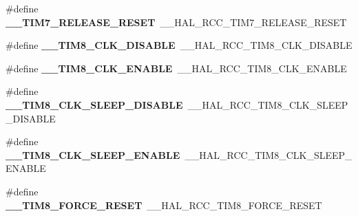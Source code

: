 \begin{DoxyCompactItemize}
\item 
\hypertarget{group___h_a_l___r_c_c___aliased_ga9bcfc1ba097bb8fbf4edef318cd34fb6}{\#define {\bfseries \-\_\-\-\_\-\-T\-I\-M7\-\_\-\-R\-E\-L\-E\-A\-S\-E\-\_\-\-R\-E\-S\-E\-T}~\-\_\-\-\_\-\-H\-A\-L\-\_\-\-R\-C\-C\-\_\-\-T\-I\-M7\-\_\-\-R\-E\-L\-E\-A\-S\-E\-\_\-\-R\-E\-S\-E\-T}\label{group___h_a_l___r_c_c___aliased_ga9bcfc1ba097bb8fbf4edef318cd34fb6}

\item 
\hypertarget{group___h_a_l___r_c_c___aliased_ga8c2578c8b1027bd9d554276d7c641a03}{\#define {\bfseries \-\_\-\-\_\-\-T\-I\-M8\-\_\-\-C\-L\-K\-\_\-\-D\-I\-S\-A\-B\-L\-E}~\-\_\-\-\_\-\-H\-A\-L\-\_\-\-R\-C\-C\-\_\-\-T\-I\-M8\-\_\-\-C\-L\-K\-\_\-\-D\-I\-S\-A\-B\-L\-E}\label{group___h_a_l___r_c_c___aliased_ga8c2578c8b1027bd9d554276d7c641a03}

\item 
\hypertarget{group___h_a_l___r_c_c___aliased_gaabcfb93496a0ddb827e34bdeb9f00f1c}{\#define {\bfseries \-\_\-\-\_\-\-T\-I\-M8\-\_\-\-C\-L\-K\-\_\-\-E\-N\-A\-B\-L\-E}~\-\_\-\-\_\-\-H\-A\-L\-\_\-\-R\-C\-C\-\_\-\-T\-I\-M8\-\_\-\-C\-L\-K\-\_\-\-E\-N\-A\-B\-L\-E}\label{group___h_a_l___r_c_c___aliased_gaabcfb93496a0ddb827e34bdeb9f00f1c}

\item 
\hypertarget{group___h_a_l___r_c_c___aliased_gae89db54c079131d2b38ea73963460103}{\#define {\bfseries \-\_\-\-\_\-\-T\-I\-M8\-\_\-\-C\-L\-K\-\_\-\-S\-L\-E\-E\-P\-\_\-\-D\-I\-S\-A\-B\-L\-E}~\-\_\-\-\_\-\-H\-A\-L\-\_\-\-R\-C\-C\-\_\-\-T\-I\-M8\-\_\-\-C\-L\-K\-\_\-\-S\-L\-E\-E\-P\-\_\-\-D\-I\-S\-A\-B\-L\-E}\label{group___h_a_l___r_c_c___aliased_gae89db54c079131d2b38ea73963460103}

\item 
\hypertarget{group___h_a_l___r_c_c___aliased_ga7e509c99ad069e570a410c60d9d4fb61}{\#define {\bfseries \-\_\-\-\_\-\-T\-I\-M8\-\_\-\-C\-L\-K\-\_\-\-S\-L\-E\-E\-P\-\_\-\-E\-N\-A\-B\-L\-E}~\-\_\-\-\_\-\-H\-A\-L\-\_\-\-R\-C\-C\-\_\-\-T\-I\-M8\-\_\-\-C\-L\-K\-\_\-\-S\-L\-E\-E\-P\-\_\-\-E\-N\-A\-B\-L\-E}\label{group___h_a_l___r_c_c___aliased_ga7e509c99ad069e570a410c60d9d4fb61}

\item 
\hypertarget{group___h_a_l___r_c_c___aliased_ga835e7ae84e532db77f3712753bf49d8a}{\#define {\bfseries \-\_\-\-\_\-\-T\-I\-M8\-\_\-\-F\-O\-R\-C\-E\-\_\-\-R\-E\-S\-E\-T}~\-\_\-\-\_\-\-H\-A\-L\-\_\-\-R\-C\-C\-\_\-\-T\-I\-M8\-\_\-\-F\-O\-R\-C\-E\-\_\-\-R\-E\-S\-E\-T}\label{group___h_a_l___r_c_c___aliased_ga835e7ae84e532db77f3712753bf49d8a}


\end{DoxyCompactItemize}
